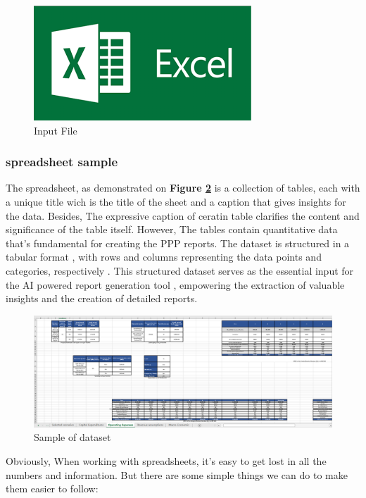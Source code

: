 \begin{figure}[H]
    \centering
    \includegraphics[width=0.5 \linewidth]{assets/excel.png}
    \caption{Input File}
    \label{fig:excl}
\end{figure}

\subsubsection{spreadsheet sample}
The spreadsheet, as demonstrated on \textbf{Figure \ref{fig:dataset}} is a collection of tables, each with a unique title wich is the title of the sheet and a caption that gives insights for the data. Besides, The expressive caption of ceratin table clarifies the content and significance of the table itself. However, The tables contain quantitative data that's fundamental for creating the PPP reports. The dataset is structured in a tabular format , with rows and columns representing the data points and categories, respectively . This structured dataset serves as the essential input for the AI powered report generation tool , empowering the extraction of valuable insights and the creation of detailed reports.
\begin{figure}[H]
    \centering
    \includegraphics[width=1 \linewidth]{assets/dataExcel.png}
    \caption{Sample of dataset}
    \label{fig:dataset}
\end{figure}
Obviously, When working with spreadsheets, it's easy to get lost in all the numbers and information. But there are some simple things we can do to make them easier to follow:

